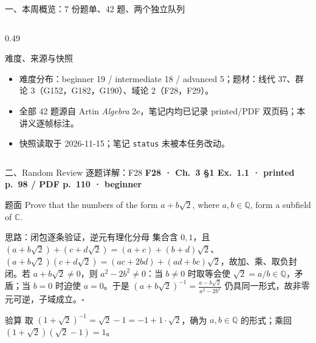 \documentclass[aspectratio=169,10pt,fontset=none]{ctexbeamer}
\newcommand{\ex}[1]{\textcolor{accent}{\footnotesize\bfseries #1}}
\begin{document}
\begin{frame}[t]{一、本周概览：7 份题单、42 题、两个独立队列}
\begin{columns}[T,onlytextwidth]
\begin{column}{0.49\textwidth}
      \begin{block}{\footnotesize 难度、来源与快照}
        \scriptsize
        \begin{itemize}\setlength{\itemsep}{1pt}
          \item 难度分布：beginner 19 / intermediate 18 / advanced 5；题材：线代 37、群论 3（G152，G182，G190）、域论 2（F28，F29）。
          \item 全部 42 题源自 Artin \textit{Algebra} 2e，笔记内均已记录 printed/PDF 双页码；本讲义逐帧标注。
          \item 快照读取于 2026-11-15；笔记 \texttt{status} 未被本任务改动。
        \end{itemize}
      \end{block}
    \end{column}
  \end{columns}
\end{frame}

\begin{frame}[t]{二、Random Review 逐题详解：F28}
  \leavevmode\ex{F28 · Ch.~3 §1 Ex.~1.1 · printed p.~98 / PDF p.~110 · beginner}
  \begin{block}{\footnotesize 题面}
    \scriptsize Prove that the numbers of the form $a+b\sqrt2$, where $a,b\in\mathbb Q$, form a subfield of $\mathbb C$.
  \end{block}
  \begin{exampleblock}{\footnotesize 思路：闭包逐条验证，逆元有理化分母}
    \scriptsize
    集合含 $0,1$，且 $(a+b\sqrt2)+(c+d\sqrt2)=(a+c)+(b+d)\sqrt2$、$(a+b\sqrt2)(c+d\sqrt2)=(ac+2bd)+(ad+bc)\sqrt2$，故加、乘、取负封闭。若 $a+b\sqrt2\ne0$，则 $a^2-2b^2\ne0$：当 $b\ne0$ 时取等会使 $\sqrt2=a/b\in\mathbb Q$，矛盾；当 $b=0$ 时迫使 $a=0$。于是
    $(a+b\sqrt2)^{-1}=\frac{a-b\sqrt2}{a^2-2b^2}$
    仍具同一形式，故非零元可逆，子域成立。$\square$
  \end{exampleblock}
  \begin{block}{\footnotesize 验算}
    \scriptsize 取 $(1+\sqrt2)^{-1}=\sqrt2-1=-1+1\cdot\sqrt2$，确为 $a,b\in\mathbb Q$ 的形式；乘回 $(1+\sqrt2)(\sqrt2-1)=1$。
  \end{block}
\end{frame}
\end{document}
